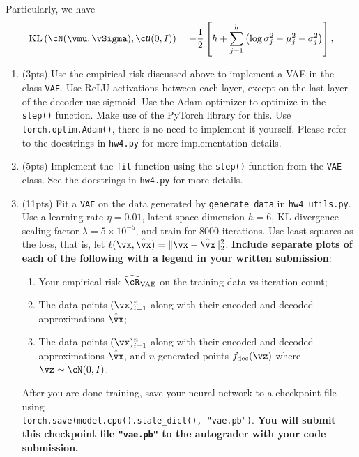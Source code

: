 \documentclass[12pt]{article}
\def\hcR{\widehat{\cR}}
\begin{document}
Particularly, we have 
\begin{align*}
    \textup{KL}\left(\cN(\vmu, \vSigma ), \cN(0,I)\right) = -\frac{1}{2} \left[ h + \sum_{j=1}^h\left( \log \sigma^2_j - \mu_j^2 - \sigma_j^2 \right) \right],
\end{align*}

\begin{enumerate}

\item (3pts) Use the empirical risk discussed above to implement a VAE in the class \texttt{VAE}.  Use ReLU activations between each layer, except on the last layer of the decoder use sigmoid.  Use the Adam optimizer to optimize in the \texttt{step()} function.  Make use of the PyTorch library for this. Use \texttt{torch.optim.Adam()}, there is no need to implement it yourself.  Please refer to the docstrings in \texttt{hw4.py} for more implementation details.
\item (5pts) Implement the \texttt{fit} function using the \texttt{step()} function from the \texttt{VAE} class.  See the docstrings in \texttt{hw4.py} for more details.  
\item (11pts) Fit a \texttt{VAE} on the data generated by \texttt{generate\_data} in \texttt{hw4\_utils.py}.  Use a learning rate $\eta = 0.01$, latent space dimension $h = 6$, KL-divergence scaling factor $\lambda = 5 \times 10^{-5}$, and train for 8000 iterations. Use least squares as the loss, that is, let $\ell(\vx,\hat\vx) = \Vert \vx - \hat\vx \Vert^2_2$.  \textbf{Include separate plots of each of the following with a legend in your written submission}:
\begin{enumerate}
\item Your empirical risk $\hcR_{\textup{VAE}}$ on the training data vs iteration count;
\item The data points $(\vx)_{i=1}^n$ along with their encoded and decoded approximations $\hat \vx$;
\item The data points $(\vx)_{i=1}^n$ along with their encoded and decoded approximations $\hat \vx$, and $n$ generated points $f_{\textup{dec}}(\vz)$ where $\vz \sim \cN ( 0, I)$.
\end{enumerate}
After you are done training, save your neural network to a checkpoint file using \\
\texttt{torch.save(model.cpu().state\_dict(), "vae.pb")}. \textbf{You will submit this checkpoint file \texttt{"vae.pb"} to the autograder with your code submission.}

 \end{enumerate}
\end{document}
